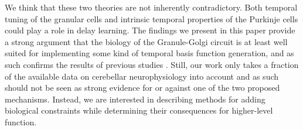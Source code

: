 We think that these two theories are not inherently contradictory. Both temporal tuning of the granular cells and intrinsic temporal properties of the Purkinje cells could play a role in delay learning.
The findings we present in this paper provide a strong argument that the biology of the Granule-Golgi circuit is at least well suited for implementing some kind of temporal basis function generation, and as such confirms the results of previous studies  \citep[cf.][]{dean2010cerebellar,rossert2015edge}.
Still, our work only takes a fraction of the available data on cerebellar neurophysiology into account and as such should not be seen as strong evidence for or against one of the two proposed mechanisms.
Instead, we are interested in describing methods for adding biological constraints while determining their consequences for higher-level function.
